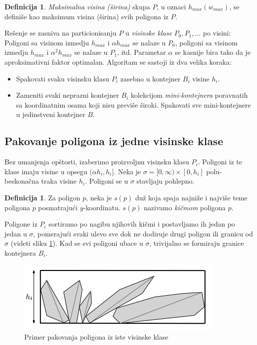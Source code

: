 \documentclass[a4paper]{article}
\theoremstyle{plain}
\theoremstyle{definition}
\newtheorem{defn}[thm]{Definicija} %
\begin{document}
\begin{defn}
    \emph{Maksimalna visina (\v{s}irina)} skupa $P$, u oznaci \emph{$h_{max} (w_{max})$}, se defini\v{s}e kao maksimum visina (\v{s}irina) svih poligona iz $P$.
\end{defn}

Re\v{s}enje se zasniva na particionisanju $P$ u \emph{visinske klase} $P_{0}, P_{1}, \dots$ po visini: Poligoni sa visinom izmedju $h_{max}$ i $\alpha h_{max}$ se nalaze u $P_{0}$, poligoni sa visinom izmedju $h_{max}$ i $\alpha^{2} h_{max}$ se nalaze u $P_{1}$, itd. Parametar $\alpha$ se kasnije bira tako da je aproksimativni faktor optimalan. Algoritam se sastoji iz dva velika koraka:
\begin{itemize}
    \item Spakovati svaku visinsku klasu $P_{i}$ zasebno u kontejner $B_{i}$ visine $h_{i}$.
    \item Zameniti svaki neprazni kontejner $B_{i}$ kolekcijom \emph{mini-kontejnera} poravnatih sa koordinatnim osama koji nisu previ\v{s}e \v{s}iroki. Spakovati sve mini-kontejnere u jedinstveni kontejner $B$.
\end{itemize}


\subsection{Pakovanje poligona iz jedne visinske klase}
\label{subsec:Korak1}

Bez umanjenja op\v{s}tosti, izaberimo proizvoljnu visinsku klasu $P_{i}$. Poligoni iz te klase imaju visine u opsegu $(\alpha h_{i}, h_{i}]$. Neka je $\sigma = [0, \infty) \times [0, h_{i}]$ polu-beskona\v{c}na traka visine $h_{i}$. Poligoni se u $\sigma$ stavljaju pohlepno.

\begin{defn}
    Za poligon $p$, neka je $s(p)$ du\v{z} koja spaja najni\v{z}e i najvi\v{s}e teme poligona $p$ posmatraju\'c{}i $y$-koordinatu. $s(p)$ nazivamo \emph{ki\v{c}mom} poligona $p$.
\end{defn}

Poligone iz $P_{i}$ sortiramo po nagibu njihovih ki\v{c}mi i postavljamo ih jedan po jedan u $\sigma$, pomeraju\'c{}i svaki ulevo sve dok ne dodiruje drugi poligon ili granicu od $\sigma$ (videti sliku \ref{fig1}). Kad se svi poligoni ubace u $\sigma$, trivijalno se formiraju granice kontejnera $B_{i}$.

\begin{figure}[H]
    \centering
    \includegraphics[scale=0.5]{resources/fig1.PNG}
    \caption{Primer pakovanja poligona iz iste visinske klase}
    \label{fig1}
\end{figure}
\end{document}
